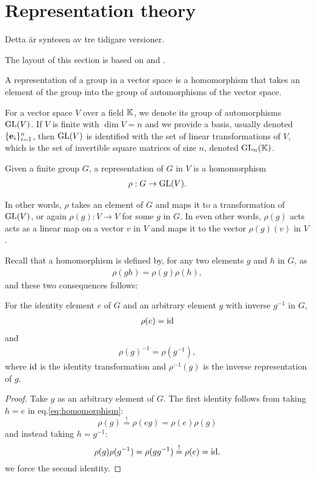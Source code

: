 \clearpage{\thispagestyle{empty}}
\section{Representation theory}

	Detta är syntesen av tre tidigare versioner. 
	
	The layout of this section is based on \cite{Serre} and \cite{FultonHarris}.
	
	A representation of a group in a vector space is a homomorphism that takes an element of the group into the group of automorphisms of the vector space.
	
	For a vector space $V$ over a field $\mathbb{K}$, we denote its group of automorphisms $\text{GL}(V)$. If $V$ is finite with $\dim V = n$ and we provide a basis, usually denoted $\{\mathbf{e}_i\}_{i=1}^n$, then $\text{GL}(V)$ is identified with the set of linear transformations of $V$, which is the set of invertible square matrices of size $n$, denoted $\text{GL}_n(\mathbb{K})$\cite[18.1]{DummitFoote}. 
	
	\begin{definition}[Representation]
		Given a finite group $G$, a representation of $G$ in $V$ is a homomorphism
		\begin{align}
			\rho: G \rightarrow \text{GL}(V).
		\end{align}
	\end{definition}
	In other words, $\rho$ takes an element of $G$ and maps it to a transformation of $\text{GL}(V)$, or again $\rho(g): V \rightarrow V$ for some $g$ in $G$. In even other words, $\rho(g)$ acts acts as a linear map on a vector $v$ in $V$ and maps it to the vector $\rho(g)(v)$ in $V$.
	
	Recall that a homomorphism is defined by, for any two elements $g$ and $h$ in $G$, as
	\begin{align}\label{eq:homomorphism}
		\rho(gh) = \rho(g)\rho(h),
	\end{align}
	and these two consequences follows:	
	\begin{proposition}
		For the identity element $e$ of $G$ and an arbitrary element $g$ with inverse $g^{-1}$ in $G$,
		\begin{align}
			\rho(e) = \text{id}
		\end{align}
		and
		\begin{align}
			\rho(g)^{-1} = \rho\left(g^{-1}\right),
		\end{align}
		where $\text{id}$ is the identity transformation and $\rho^{-1}(g)$ is the inverse representation of $g$.
	\end{proposition}
	\begin{proof}
		Take $g$ as an arbitrary element of $G$. The first identity follows from taking $h=e$ in eq.\ref{eq:homomorphism}:
		\[
		\rho(g) \overset{!}{=} \rho(eg) = \rho(e)\rho(g)
		\]
		and instead taking $h=g^{-1}$:
		\[
		\rho(g) \rho(g^{-1}) =  \rho(gg^{-1}) \overset{!}{=} \rho(e) = \text{id}.
		\]
		we force the second identity.
	\end{proof}
	
